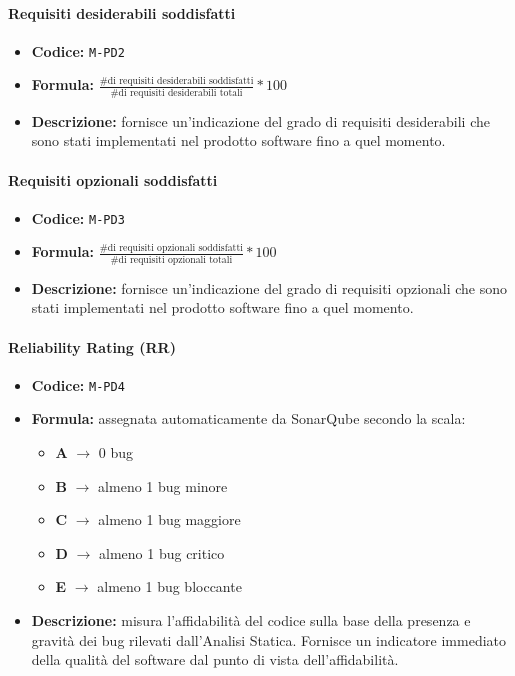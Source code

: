 \documentclass[a4paper,12pt]{article}
\begin{document}
\paragraph{Requisiti desiderabili soddisfatti}
\begin{itemize}
    \item \textbf{Codice:} \texttt{M-PD2} 
    \item \textbf{Formula:} $\frac{\text{\# di requisiti desiderabili soddisfatti}}{\text{\# di requisiti desiderabili totali}}*100$
    \item \textbf{Descrizione:} fornisce un'indicazione del grado di requisiti desiderabili che sono stati implementati nel prodotto software fino a quel momento.
\end{itemize}

\paragraph{Requisiti opzionali soddisfatti}
\begin{itemize}
    \item \textbf{Codice:} \texttt{M-PD3} 
    \item \textbf{Formula:} $\frac{\text{\# di requisiti opzionali soddisfatti}}{\text{\# di requisiti opzionali totali}}*100$
    \item \textbf{Descrizione:} fornisce un'indicazione del grado di requisiti opzionali che sono stati implementati nel prodotto software fino a quel momento. 
\end{itemize}

\paragraph{Reliability Rating (RR)}
\begin{itemize}
\item \textbf{Codice:} \texttt{M-PD4}
\item \textbf{Formula:} assegnata automaticamente da SonarQube secondo la scala:
\begin{itemize}
    \item \textbf{A} $\rightarrow$ 0 bug
    \item \textbf{B} $\rightarrow$ almeno 1 bug minore
    \item \textbf{C} $\rightarrow$ almeno 1 bug maggiore
    \item \textbf{D} $\rightarrow$ almeno 1 bug critico
    \item \textbf{E} $\rightarrow$ almeno 1 bug bloccante
\end{itemize}
\item \textbf{Descrizione:} misura l'affidabilità del codice sulla base della presenza 
e gravità dei bug rilevati dall'Analisi Statica. Fornisce un indicatore immediato della qualità 
del software dal punto di vista dell'affidabilità.
\end{itemize}
\end{document}
